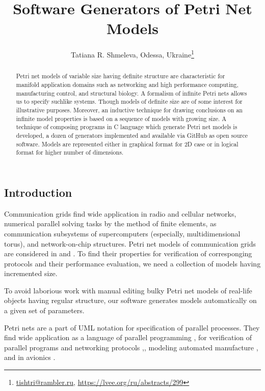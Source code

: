 \documentclass[10pt, a5paper]{article}
\begin{document}
\title{Software Generators of Petri Net Models}
\author{Tatiana R. Shmeleva, Odessa, Ukraine\footnote{\url{tishtri@rambler.ru}, \url {https://lvee.org/ru/abstracts/299}}}
\maketitle
\begin{abstract}
Petri net models of variable size having definite structure are characteristic for manifold application domains such as \linebreak networking and high performance computing, manufacturing \linebreak control, and structural biology. A formalism of infinite Petri nets allows us to specify suchlike systems. Though models of definite size are of some interest for illustrative purposes. Moreover, an inductive technique for drawing conclusions on an infinite model properties is based on a sequence of models with growing size. A technique of composing programs in C language which generate Petri net models is developed, a dozen of generators implemented and available via GitHub as open source software. Models are represented either in graphical format for 2D case or in logical format for higher number of dimensions. 
\end{abstract}
\subsection*{Introduction}

Communication grids find wide application in radio and cellular networks, numerical parallel solving tasks by the method of finite ele\-ments, as communication subsystems of supercomputers (especially, multidimensional torus), and network-on-chip structures. Petri net \linebreak models of communication grids are considered in \cite{bib1} and \cite{bib2}. To find their properties for verification of corresponging protocols and their performance evaluation, we need a collection of models having incremen\-ted size.

To avoid laborious work with manual editing bulky Petri net models of real-life objects having regular structure, our software generates models automatically on a given set of parameters.

Petri nets are a part of UML notation \cite{bib3} for specification of parallel processes. They find wide application as a language of parallel programming \cite{bib4}, for verification of parallel programs and networking \linebreak protocols \cite{bib1},\cite{bib2}, modeling automated manufacture \cite{bib5}, and in avionics \cite{bib6}.
\end{document}

